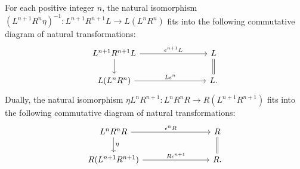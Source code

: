 \begin{lem}\label{lem_LRcommute}
For each positive integer $n$, the natural isomorphism 
$(L^{n + 1} R^n \eta)^{-1}: L^{n + 1}R^{n + 1} L \to
L(L^n R^n)$ fits into the following commutative diagram of
natural transformations:
\begin{equation}\label{eq_Ltl_com_diag}
\begin{tikzcd}[column sep=80pt]
L^{n + 1}R^{n + 1}L \arrow{r}{\epsilon^{n + 1}L} \arrow{d} &
L \arrow[equals]{d} \\
L(L^{n}R^n) \arrow{r}{L\epsilon^{n}} &
L.
\end{tikzcd}
\end{equation}
Dually, the natural isomorphism $\eta L^nR^{n + 1}:
L^nR^n R \to R(L^{n + 1}R^{n + 1})$ fits into the following
commutative diagram of natural transformations:
\begin{equation}\label{eq_Rtl_com_diag}
\begin{tikzcd}[column sep=80pt]
L^nR^nR \arrow{r}{\epsilon^n R} 
   \arrow{d}{\eta} &
R \arrow[equals]{d} \\
R (L^{n + 1} R^{n + 1}) \arrow{r}{R \epsilon^{n + 1}} &
R.
\end{tikzcd}
\end{equation}
\end{lem}

